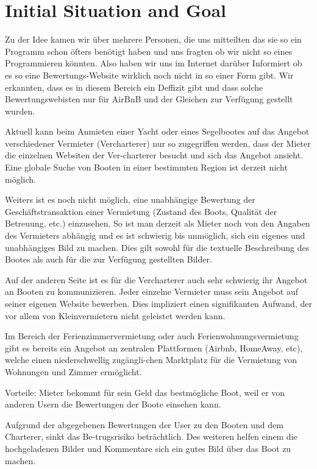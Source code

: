 \documentclass[12pt]{article}
\theoremstyle{definition}
\newenvironment{explanation}{%
   \setlength{\parindent}{0pt}
   \itshape
   \color{blue}
}{}
\begin{document}
\section{Initial Situation and Goal}
\begin{explanation}
	Zu der Idee kamen wir über mehrere Personen, die uns mitteilten das sie so ein Programm schon öfters benötigt haben und uns fragten ob wir nicht so eines Programmieren könnten. Also haben wir uns im Internet darüber Informiert ob es so eine Bewertungs-Website wirklich noch nicht in so einer Form gibt.
	Wir erkannten, dass es in diesem Bereich ein Deffizit gibt und dass solche Bewertungswebisten nur für AirBnB und der Gleichen zur Verfügung gestellt wurden.
	
	Aktuell kann beim Anmieten einer Yacht oder eines Segelbootes auf das Angebot verschiedener Vermieter (Vercharterer) nur so zugegriffen werden, dass der Mieter die einzelnen Websiten der Ver-charterer besucht und sich das Angebot ansieht. Eine globale Suche von Booten in einer bestimmten Region ist derzeit nicht möglich.
	
	Weiters ist es noch nicht möglich, eine unabhängige Bewertung der Geschäfts\-trans\-aktion einer Vermietung (Zustand des Boots, Qualität der Betreuung, etc.) einzusehen. So ist man derzeit als Mieter noch von den Angaben des Vermieters abhängig und es ist schwierig bis unmöglich, sich ein eigenes und unabhängiges Bild zu machen. Dies gilt sowohl für die textuelle Beschreibung des Bootes als auch für die zur Verfügung gestellten Bilder.
	
	Auf der anderen Seite ist es für die Vercharterer auch sehr schwierig ihr Angebot an Booten zu kommunizieren. Jeder einzelne Vermieter muss sein Angebot auf seiner eigenen Website bewerben. Dies impliziert einen signifikanten Aufwand, der vor allem von Kleinvermietern nicht geleistet werden kann.
	
	Im Bereich der Ferienzimmervermietung oder auch Ferienwohnungsvermietung gibt es bereits ein Angebot an zentralen Plattformen (Airbnb, HomeAway, etc), welche einen niederschwellig zugängli-chen Marktplatz für die Vermietung von Wohnungen und Zimmer ermöglicht.
	
	Vorteile:
	Mieter bekommt für sein Geld das bestmögliche Boot, weil er von anderen Usern die Bewertungen der Boote einsehen kann.
	
	Aufgrund der abgegebenen Bewertungen der User zu den Booten und dem Charterer, sinkt das Be-trugsrisiko beträchtlich. Des weiteren helfen einem die hochgeladenen Bilder und Kommentare sich ein gutes Bild über das Boot zu machen.
	

\end{explanation}
\end{document}

